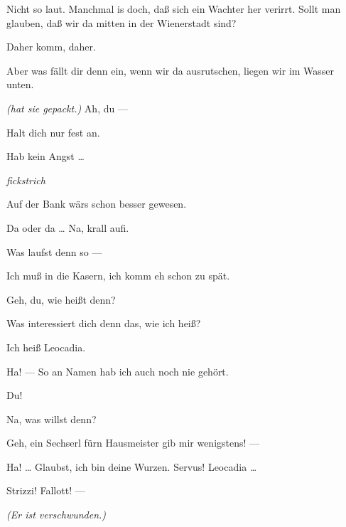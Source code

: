 \documentclass[
	final,
	a4paper,
	ngerman,
	mpinclude = true, %
	twoside = true,
	open = right,
	cleardoublepage = plain,
	DIV = 13,
	BCOR = 1cm,
	titlepage = firstiscover,
	]{scrbook}
\newcommand{\direction}[1]{\textit{(#1)}}
\newcommand{\hiat}{%
	\begin{center}
		\tiny
		\raisebox{0.5ex}{\rule{0.3\linewidth}{0.4pt}}
		\textit{fickstrich}
		\raisebox{0.5ex}{\rule{0.3\linewidth}{0.4pt}}
	\end{center}
}
\newcommand{\thecharacter}[1]{\textup{\textsc{#1}}\xspace}
\newcommand{\thedirne}{\thecharacter{Nutte}}
\newcommand{\thesoldat}{\thecharacter{Soldatin}}
\newcommand{\character}[1]{\item[#1:]}
\newcommand{\dirne}{\character{\thedirne}}
\newcommand{\soldat}{\character{\thesoldat}}
\begin{document}
\begin{play}
	\dirne
	Nicht so laut. Manchmal is doch, daß sich ein Wachter her verirrt. Sollt man glauben, daß wir da mitten in der Wienerstadt sind?

	\soldat
	Daher komm, daher.

	\dirne
	Aber was fällt dir denn ein, wenn wir da ausrutschen, liegen wir im Wasser unten.

	\soldat
	\direction{hat sie gepackt.} Ah, du ---

	\dirne
	Halt dich nur fest an.

	\soldat
	Hab kein Angst \ldots{}

	\hiat

	\dirne
	Auf der Bank wärs schon besser gewesen.

	\soldat
	Da oder da \ldots{} Na, krall aufi.

	\dirne
	Was laufst denn so ---

	\soldat
	Ich muß in die Kasern, ich komm eh schon zu spät.

	\dirne
	Geh, du, wie heißt denn?

	\soldat
	Was interessiert dich denn das, wie ich heiß?

	\dirne
	Ich heiß Leocadia.

	\soldat
	Ha! --- So an Namen hab ich auch noch nie gehört.

	\dirne
	Du!

	\soldat
	Na, was willst denn?

	\dirne
	Geh, ein Sechserl fürn Hausmeister gib mir wenigstens! ---

	\soldat
	Ha! \ldots{} Glaubst, ich bin deine Wurzen. Servus! Leocadia \ldots{}

	\dirne
	Strizzi! Fallott! ---

	\direction{Er ist verschwunden.}

\end{play}
\end{document}
